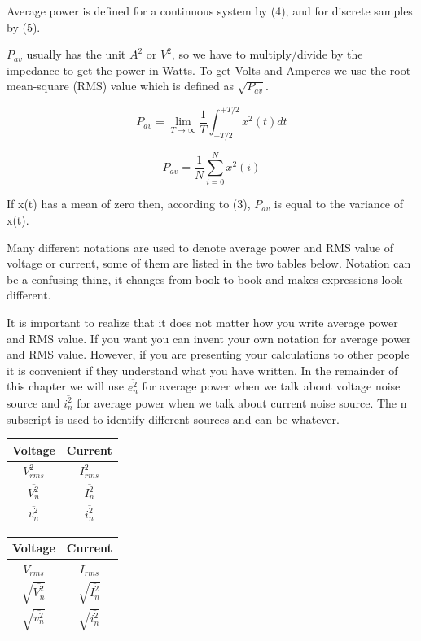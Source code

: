 Average power is defined for a continuous system by (4), and for
discrete samples by (5).

\(P_{av}\) usually has the unit \(A^2\) or \(V^2\), so we have to
multiply/divide by the impedance to get the power in Watts. To get Volts
and Amperes we use the root-mean-square (RMS) value which is defined as
\(\sqrt{P_{av}}\).

\[P_{av} = \lim_{T\to\infty} \frac{1}{T} \int^{+T/2}_{-T/2} x^2(t) dt \tag{4}\]

\[P_{av} = \frac{1}{N}\sum_{i=0}^N x^2(i) \tag{5}\]

If x(t) has a mean of zero then, according to (3), \(P_{av}\) is equal
to the variance of x(t).

Many different notations are used to denote average power and RMS value
of voltage or current, some of them are listed in the two tables below.
Notation can be a confusing thing, it changes from book to book and
makes expressions look different.

It is important to realize that it does not matter how you write average
power and RMS value. If you want you can invent your own notation for
average power and RMS value. However, if you are presenting your
calculations to other people it is convenient if they understand what
you have written. In the remainder of this chapter we will use
\(\overline{e_n^2}\) for average power when we talk about voltage noise
source and \(\overline{i_n^2}\) for average power when we talk about
current noise source. The n subscript is used to identify different
sources and can be whatever.

\label{t:rms}
\begin{longtable}[]{@{}cc@{}}
\toprule\noalign{}
Voltage & Current \\
\midrule\noalign{}
\endhead
\bottomrule\noalign{}
\endlastfoot
\(V_{rms}^2\) & \(I_{rms}^2\) \\
\(\overline{V_n^2}\) & \(\overline{I_n^2}\) \\
\(\overline{v_n^2}\) & \(\overline{i_n^2}\) \\
\end{longtable}

\label{t:rms}
\begin{longtable}[]{@{}cc@{}}
\toprule\noalign{}
Voltage & Current \\
\midrule\noalign{}
\endhead
\bottomrule\noalign{}
\endlastfoot
\(V_{rms}\) & \(I_{rms}\) \\
\(\sqrt{\overline{V_n^2}}\) & \(\sqrt{\overline{I_n^2}}\) \\
\(\sqrt{\overline{v_n^2}}\) & \(\sqrt{\overline{i_n^2}}\) \\
\end{longtable}

